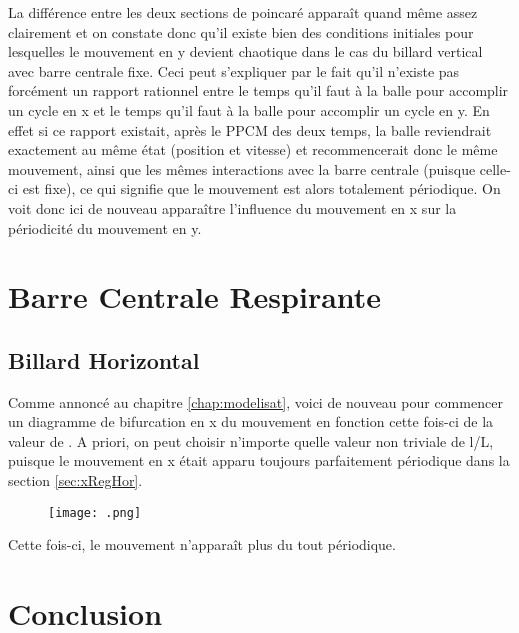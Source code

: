 \documentclass[a4paper]{report}
\begin{document}
La différence entre les deux sections de poincaré apparaît quand même assez clairement et on constate donc qu'il existe bien des conditions initiales pour lesquelles le mouvement en y devient chaotique dans le cas du billard vertical avec barre centrale fixe. Ceci peut s'expliquer par le fait qu'il n'existe pas forcément un rapport rationnel entre le temps qu'il faut à la balle pour accomplir un cycle en x et le temps qu'il faut à la balle pour accomplir un cycle en y. En effet si ce rapport existait, après le PPCM des deux temps, la balle reviendrait exactement au même état (position et vitesse) et recommencerait donc le même mouvement, ainsi que les mêmes interactions avec la barre centrale (puisque celle-ci est fixe), ce qui signifie que le mouvement est alors totalement périodique. On voit donc ici de nouveau apparaître l'influence du mouvement en x sur la périodicité du mouvement en y.

\chapter{Barre Centrale Respirante}

\section{Billard Horizontal}
Comme annoncé au chapitre \ref{chap:modelisat}, voici de nouveau pour commencer un diagramme de bifurcation en x du mouvement en fonction cette fois-ci de la valeur de \omega. A priori, on peut choisir n'importe quelle valeur non triviale de l/L, puisque le mouvement en x était apparu toujours parfaitement périodique dans la section \ref{sec:xRegHor}.
\begin{figure}[h!]
   \texttt{[image: .png]}
      \caption[]{}
\end{figure}

Cette fois-ci, le mouvement n'apparaît plus du tout périodique.



\chapter{Conclusion}


%
%
\end{document}

